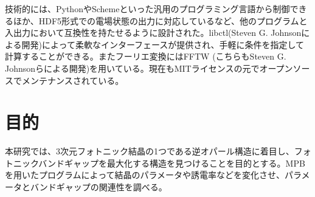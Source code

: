 \documentclass[platex,dvipdfmx,draft]{jsreport}
\numberwithin{equation}{section}
\begin{document}
技術的には、PythonやSchemeといった汎用のプログラミング言語から制御できるほか、HDF5形式での電場状態の出力に対応しているなど、他のプログラムと入出力において互換性を持たせるように設計された。libctl(Steven G. Johnsonによる開発)によって柔軟なインターフェースが提供され、手軽に条件を指定して計算することができる。またフーリエ変換にはFFTW (こちらもSteven G. Johnsonらによる開発)を用いている。現在もMITライセンスの元でオープンソースでメンテナンスされている。


\section{目的}
本研究では、3次元フォトニック結晶の1つである逆オパール構造に着目し、フォトニックバンドギャップを最大化する構造を見つけることを目的とする。MPBを用いたプログラムによって結晶のパラメータや誘電率などを変化させ、パラメータとバンドギャップの関連性を調べる。
\end{document}
